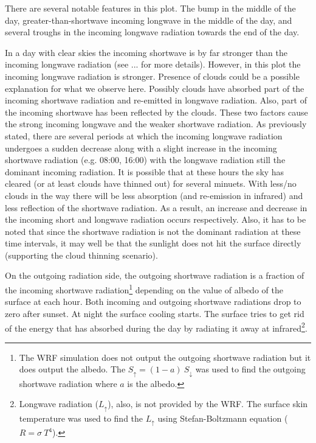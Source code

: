 \documentclass[a4paper,12pt]{article}
\numberwithin{equation}{section} %
\begin{document}
\vspace{1cm}

There are several notable features in this plot. The bump in the middle of the day, greater-than-shortwave incoming longwave in the middle of the day, and several troughs in the incoming longwave radiation towards the end of the day.

In a day with clear skies the incoming shortwave is by far stronger than the incoming longwave radiation (see ... for more details). However, in this plot the incoming longwave radiation is stronger. Presence of clouds could be a possible explanation for what we observe here. Possibly clouds have absorbed part of the incoming shortwave radiation and re-emitted in longwave radiation. Also, part of the incoming shortwave has been reflected by the clouds. These two factors cause the strong incoming longwave and the weaker shortwave radiation. As previously stated, there are several periods at which the incoming longwave radiation undergoes a sudden decrease along with a slight increase in the incoming shortwave radiation (e.g. 08:00, 16:00) with the longwave radiation still the dominant incoming radiation. It is possible that at these hours the sky has cleared (or at least clouds have thinned out) for several minuets. With less/no clouds in the way there will be less absorption (and re-emission in infrared) and less reflection of the shortwave radiation. As a result, an increase and decrease in the incoming short and longwave radiation occurs respectively. Also, it has to be noted that since the shortwave radiation is not the dominant radiation at these time intervals, it may well be that the sunlight does not hit the surface directly (supporting the cloud thinning scenario).

On the outgoing radiation side, the outgoing shortwave radiation is a fraction of the incoming shortwave radiation\footnote{The WRF simulation does not output the outgoing shortwave radiation but it does output the albedo. The $S_{\uparrow} = (1 - a)\: S_{\downarrow}$ was used to find the outgoing shortwave radiation where $a$ is the albedo.} depending on the value of albedo of the surface at each hour. Both incoming and outgoing shortwave radiations drop to zero after sunset. At night the surface cooling starts. The surface tries to get rid of the energy that has absorbed during the day by radiating it away at infrared\footnote{Longwave radiation ($L_{\uparrow}$), also, is not provided by the WRF. The surface skin temperature was used to find the $L_{\uparrow}$ using Stefan-Boltzmann equation ($R = \sigma \: T^4$).}. 
\end{document}
